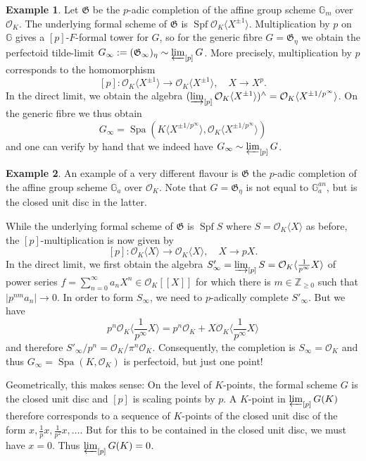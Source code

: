 \documentclass[10pt,oneside]{amsart}
\theoremstyle{definition}
\newtheorem*{example}{Example}
\begin{document}
	\begin{example}
		Let $\mathfrak G$ be the $p$-adic completion of the affine group scheme $\mathbb G_m$ over $\mathcal O_K$. The underlying formal scheme of $\mathfrak G$ is $\operatorname {Spf} \mathcal O_K\langle X^{\pm 1} \rangle$.  Multiplication by $p$ on $\mathbb G$ gives a $[p]$-$F$-formal tower for $G$, so for the generic fibre $G=\mathfrak G_\eta$ we obtain the perfectoid tilde-limit $G_\infty := (\mathfrak G_\infty)_{\eta} \sim \varprojlim_{[p]} G$. More precisely,  multiplication by $p$ corresponds to the homomorphism
		\[[p]:\mathcal O_K\langle X^{\pm 1} \rangle\rightarrow  \mathcal O_K\langle X^{\pm 1} \rangle, \quad X\rightarrow X^{p}.\]
		In the direct limit, we obtain the algebra $   (\varinjlim_{[p]} \mathcal O_K\langle X^{\pm 1} \rangle  )^{\wedge} = \mathcal O_K\langle  X^{\pm 1/p^\infty} \rangle$. On the generic fibre we thus obtain
		$$G_\infty = \operatorname{Spa}(K\langle X^{\pm 1/p^\infty} \rangle,\mathcal O_K\langle X^{\pm 1/p^\infty} \rangle)$$
		and one can verify by hand that we indeed have $G_\infty \sim \varprojlim_{[p]} G$.
	\end{example}
	\begin{example}
		An example of a very different flavour is $\mathfrak G$ the $p$-adic completion of the affine group scheme $\mathbb G_a$ over $\mathcal O_K$. Note that $G=\mathfrak G_\eta$ is not equal to $\mathbb G_a^{an}$, but is the closed unit disc in the latter.
		
		While the underlying formal scheme of $\mathfrak G$ is $\operatorname {Spf} S$ where $S=\mathcal O_K\langle X \rangle$ as before, the $[p]$-multiplication is now given by
		\[[p]:\mathcal O_K\langle X \rangle\rightarrow  \mathcal O_K\langle X \rangle, \quad X\rightarrow pX.\]
		In the direct limit, we first obtain the algebra $S'_\infty = \varinjlim_{[p]} S = \mathcal O_K\langle \frac{1}{p^\infty}X \rangle$ of power series $f=\sum_{n=0}^\infty  a_nX^n\in \mathcal O_K[[X]]$ for which there is $m\in \mathbb Z_{\geq 0}$ such that $|p^{nm}a_n|\to 0$. In order to form $S_\infty$, we need to $p$-adically complete $S'_\infty$. But we have 
		\[p^n\mathcal O_K\langle \frac{1}{p^\infty}X \rangle = p^n\mathcal O_K + X \mathcal O_K\langle \frac{1}{p^\infty}X \rangle\]
		and therefore $S'_\infty/p^n=\mathcal O_K/\pi^n\mathcal O_K$. Consequently, the completion is $S_\infty = \mathcal O_K$ and thus $G_\infty = \operatorname{Spa}(K,\mathcal O_K)$ is perfectoid, but just one point!
		
		Geometrically, this makes sense: On the level of $K$-points, the formal scheme $G$ is the closed unit disc and $[p]$ is scaling points by $p$. A $K$-point in $\varprojlim_{[p]} G(K)$ therefore corresponds to a sequence of $K$-points of the closed unit disc of the form $x,\frac{1}{p}x,\frac{1}{p^2}x,\dots$. But for this to be contained in the closed unit disc, we must have $x=0$. Thus $\varprojlim_{[p]} G(K)=0$.
		
	\end{example}
	
\end{document}
